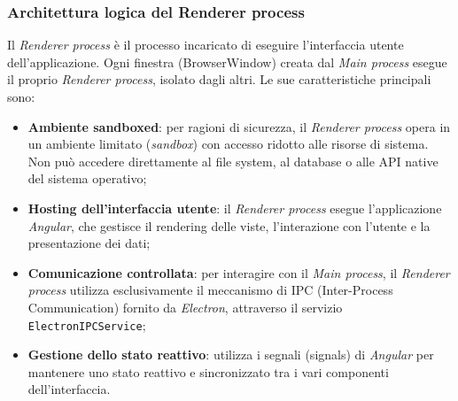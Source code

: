 \documentclass[a4paper,12pt]{article}
\begin{document}
{{            \subsubsection{Architettura logica del Renderer process} {
                Il \textit{Renderer process} è il processo incaricato di eseguire l'interfaccia utente dell'applicazione. Ogni finestra (BrowserWindow) creata dal \textit{Main process} esegue il proprio \textit{Renderer process}, isolato dagli altri. Le sue caratteristiche principali sono:
                \begin{itemize}
                    \item \textbf{Ambiente sandboxed}: per ragioni di sicurezza, il \textit{Renderer process} opera in un ambiente limitato (\textit{sandbox}) con accesso ridotto alle risorse di sistema. Non può accedere direttamente al file system, al database o alle API native del sistema operativo;
                    \item \textbf{Hosting dell'interfaccia utente}: il \textit{Renderer process} esegue l'applicazione \textit{Angular}, che gestisce il rendering delle viste, l'interazione con l'utente e la presentazione dei dati;
                    \item \textbf{Comunicazione controllata}: per interagire con il \textit{Main process}, il \textit{Renderer process} utilizza esclusivamente il meccanismo di IPC (Inter-Process Communication) fornito da \textit{Electron}, attraverso il servizio \texttt{ElectronIPCService};
                    \item \textbf{Gestione dello stato reattivo}: utilizza i segnali (signals) di \textit{Angular} per mantenere uno stato reattivo e sincronizzato tra i vari componenti dell'interfaccia.
                \end{itemize}
                
}}}
\end{document}
